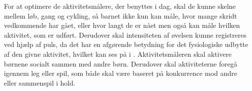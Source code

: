 For at optimere de aktivitetsmålere, der benyttes i dag, skal de kunne skelne mellem løb, gang og cykling, så barnet ikke kun kan måle, hvor mange skridt vedkommende har gået, eller hvor langt de er nået men også kan måle hvilken aktivitet, som er udført. Derudover skal intensiteten af øvelsen kunne registreres ved hjælp af puls, da det har en afgørende betydning for det fysiologiske udbytte af den givne aktivitet, hvilket kan ses på  i .\newline
Aktivitetsmåleren skal aktivere børnene socialt sammen med andre børn. Derudover skal aktiviteterne foregå igennem leg eller spil, som både skal være baseret på konkurrence mod andre eller sammenspil i hold. 